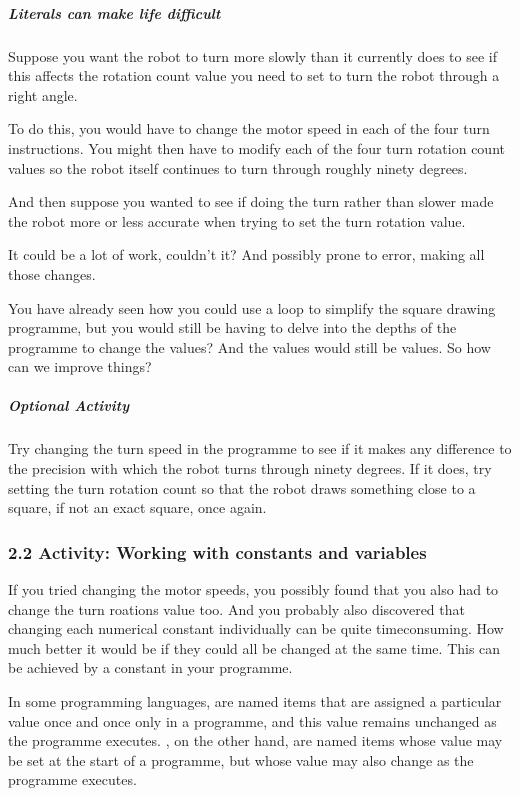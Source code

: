 \documentclass[letterpaper,10pt,english]{sphinxmanual}
\begin{document}
{\subparagraph{Literals can make life difficult}
\label{\detokenize{content/01_Robot_Lab/Section_00_02:Literals-can-make-life-difficult}}
Suppose you want the robot to turn more slowly than it currently does to see if this affects the rotation count value you need to set to turn the robot through a right angle.

To do this, you would have to change the motor speed in each of the four turn instructions. You might then have to modify each of the four turn rotation count values so the robot itself continues to turn through roughly ninety degrees.

And then suppose you wanted to see if doing the turn  rather than slower made the robot more or less accurate when trying to set the turn rotation value.

It could be a lot of work, couldn’t it? And possibly prone to error, making all those changes.

You have already seen how you could use a loop to simplify the square drawing programme, but you would still be having to delve into the depths of the programme to change the values? And the values would still be  values. So how can we improve things?


\subparagraph{Optional Activity}
\label{\detokenize{content/01_Robot_Lab/Section_00_02:Optional-Activity}}
Try changing the turn speed in the programme to see if it makes any difference to the precision with which the robot turns through ninety degrees. If it does, try setting the turn rotation count so that the robot draws something close to a square, if not an exact square, once again.


\subsubsection{2.2 Activity: Working with constants and variables}
\label{\detokenize{content/01_Robot_Lab/Section_00_02:2.2-Activity:-Working-with-constants-and-variables}}
If you tried changing the motor speeds, you possibly found that you also had to change the turn roations value too. And you probably also discovered that changing each numerical constant individually can be quite time\sphinxhyphen{}consuming. How much better it would be if they could all be changed at the same time. This can be achieved by  a constant in your programme.

In some programming languages,  are named items that are assigned a particular value once and once only in a programme, and this value remains unchanged as the programme executes. , on the other hand, are named items whose value may be set at the start of a programme, but whose value may also change as the programme executes.

}
\end{document}
